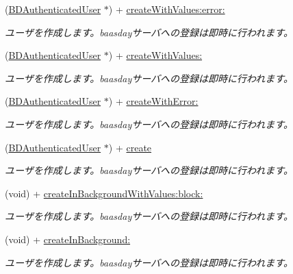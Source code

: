 \begin{DoxyCompactItemize}
\item 
(\hyperlink{interface_b_d_authenticated_user}{B\-D\-Authenticated\-User} $\ast$) + \hyperlink{interface_b_d_authenticated_user_a60810e84160eeb3c547db67de582db60}{create\-With\-Values\-:error\-:}
\begin{DoxyCompactList}\small\item\em ユーザを作成します。baasdayサーバへの登録は即時に行われます。 \end{DoxyCompactList}\item 
(\hyperlink{interface_b_d_authenticated_user}{B\-D\-Authenticated\-User} $\ast$) + \hyperlink{interface_b_d_authenticated_user_a8fbfc9e494874aa7b49ccf81f82addfc}{create\-With\-Values\-:}
\begin{DoxyCompactList}\small\item\em ユーザを作成します。baasdayサーバへの登録は即時に行われます。 \end{DoxyCompactList}\item 
(\hyperlink{interface_b_d_authenticated_user}{B\-D\-Authenticated\-User} $\ast$) + \hyperlink{interface_b_d_authenticated_user_a632dce13be1bb28c0e200d515411aa39}{create\-With\-Error\-:}
\begin{DoxyCompactList}\small\item\em ユーザを作成します。baasdayサーバへの登録は即時に行われます。 \end{DoxyCompactList}\item 
(\hyperlink{interface_b_d_authenticated_user}{B\-D\-Authenticated\-User} $\ast$) + \hyperlink{interface_b_d_authenticated_user_a180aaa05728e33efacf4ca28484302f0}{create}
\begin{DoxyCompactList}\small\item\em ユーザを作成します。baasdayサーバへの登録は即時に行われます。 \end{DoxyCompactList}\item 
(void) + \hyperlink{interface_b_d_authenticated_user_a1ef5387cf8e1ae296bc9604c786e79f6}{create\-In\-Background\-With\-Values\-:block\-:}
\begin{DoxyCompactList}\small\item\em ユーザを作成します。baasdayサーバへの登録は即時に行われます。 \end{DoxyCompactList}\item 
(void) + \hyperlink{interface_b_d_authenticated_user_a00f0e6a4344a98ca5502b30a9b4aeffc}{create\-In\-Background\-:}
\begin{DoxyCompactList}\small\item\em ユーザを作成します。baasdayサーバへの登録は即時に行われます。 \end{DoxyCompactList}\item 

\end{DoxyCompactItemize}
